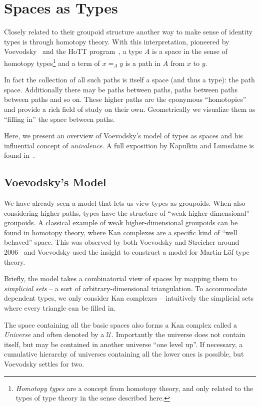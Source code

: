\section{Spaces as Types}\label{sec:spaces}

Closely related to their groupoid structure another way to make sense of
identity types is through homotopy theory. With
this interpretation, pioneered by Voevodsky~\cite{voevodsky2014} and the HoTT
program~\cite{hottbook}, a type $A$ is a space in the sense of homotopy
types\footnote{\emph{Homotopy types} are a concept from homotopy theory, and only
related to the types of type theory in the sense described here.} and
a term of $x =_A y$ is a path in $A$ from $x$ to $y$.

In fact the collection of all such paths is itself a space (and thus a type):
the path space. Additionally there may be paths between paths, paths between
paths between paths and so on. These higher paths are the eponymous
``homotopies'' and provide a rich field of study on their own.
Geometrically we visualize them as ``filling in'' the space between paths.

Here, we present an overview of Voevodsky's model of types as spaces and his
influential concept of \emph{univalence}. A full exposition by
Kapulkin and Lumsdaine is found in~\cite{kapulkin2012}.

\subsection{Voevodsky's Model}
We have already seen a model that lets us view types as groupoids. When also
considering higher paths, types have the structure of ``weak higher-dimensional''
groupoids. A classical example of weak higher-dimensional groupoids can be found
in homotopy theory, where Kan complexes are a specific kind of ``well
behaved'' space. This was observed by both Voevodsky and Streicher around
2006~\cite{streicher2014sset} and Voevodsky used the insight to construct a
model for Martin-L\"of type theory.

Briefly, the model takes a combinatorial view of spaces by mapping them to
\emph{simplicial sets} -- a sort of arbitrary-dimensional triangulation. To
accommodate dependent types, we only consider Kan complexes -- intuitively the
simplicial sets where every triangle can be filled in.

The space containing all the basic spaces also forms a Kan complex
called a \emph{Universe} and often denoted by a $\mathcal{U}$.
Importantly the universe does not contain itself, but
may be contained in another universe ``one level up''. If necessary, a
cumulative hierarchy of universes containing all the lower ones is possible, but
Voevodsky settles for two.


